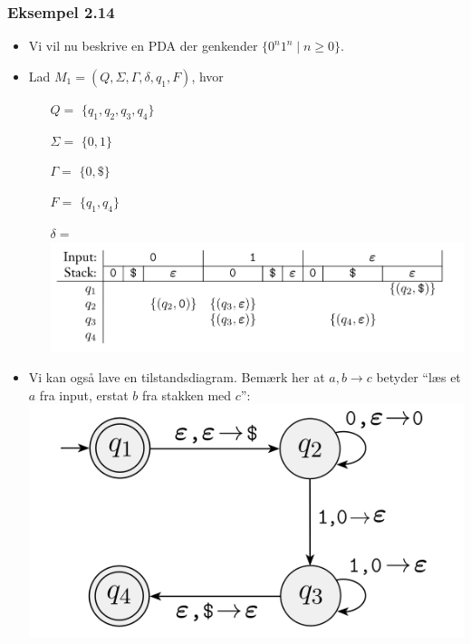 \begin{frame}[allowframebreaks]
	\frametitle{Eksempel 2.14}

	\begin{itemize}
		\item Vi vil nu beskrive en PDA der genkender $\{0^{n}1^{n} \mid n \ge 0\}$.
		\item Lad $M_{1} = (Q, \Sigma, \Gamma, \delta, q_{1}, F)$, hvor
		      \begin{enumerate}
			      \item[$Q = $] $\{q_{1}, q_{2}, q_{3}, q_{4}\}$
			      \item[$\Sigma = $] $\{0, 1\}$
			      \item[$\Gamma = $] $\{0, \mathdollar \}$
			      \item[$F = $] $\{q_{1}, q_{4}\}$
			      \item[$\delta = $]
			            \includegraphics[scale=0.3]{figur/eksempel214.png}
		      \end{enumerate}

		\item Vi kan også lave en tilstandsdiagram. Bemærk her at $a,b \longrightarrow c$ betyder ``læs et $a$ fra input, erstat $b$ fra stakken med $c$'': \\
		      \includegraphics[scale=0.4]{figur/figur215.png}
	\end{itemize}
\end{frame}

